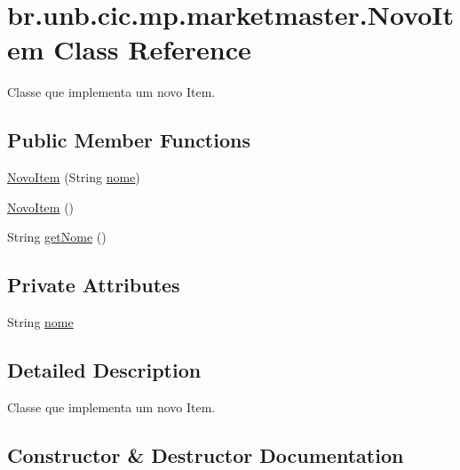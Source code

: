 \hypertarget{classbr_1_1unb_1_1cic_1_1mp_1_1marketmaster_1_1NovoItem}{}\section{br.\+unb.\+cic.\+mp.\+marketmaster.\+Novo\+Item Class Reference}
\label{classbr_1_1unb_1_1cic_1_1mp_1_1marketmaster_1_1NovoItem}


Classe que implementa um novo Item.  


\subsection*{Public Member Functions}
\begin{DoxyCompactItemize}
\item 
\mbox{\hyperlink{classbr_1_1unb_1_1cic_1_1mp_1_1marketmaster_1_1NovoItem_a4899dd2c093220a02efad4d4631515eb}{Novo\+Item}} (String \mbox{\hyperlink{classbr_1_1unb_1_1cic_1_1mp_1_1marketmaster_1_1NovoItem_aad525529a4cc862db37990ffa93df983}{nome}})
\item 
\mbox{\hyperlink{classbr_1_1unb_1_1cic_1_1mp_1_1marketmaster_1_1NovoItem_ac355bd6d0a0c8d90d84b3e926c0405bf}{Novo\+Item}} ()
\item 
String \mbox{\hyperlink{classbr_1_1unb_1_1cic_1_1mp_1_1marketmaster_1_1NovoItem_a7abc41e76abf1f6e19e0624ce954df1e}{get\+Nome}} ()
\end{DoxyCompactItemize}
\subsection*{Private Attributes}
\begin{DoxyCompactItemize}
\item 
String \mbox{\hyperlink{classbr_1_1unb_1_1cic_1_1mp_1_1marketmaster_1_1NovoItem_aad525529a4cc862db37990ffa93df983}{nome}}
\end{DoxyCompactItemize}


\subsection{Detailed Description}
Classe que implementa um novo Item. 

\subsection{Constructor \& Destructor Documentation}
\mbox{\label{classbr_1_1unb_1_1cic_1_1mp_1_1marketmaster_1_1NovoItem_a4899dd2c093220a02efad4d4631515eb}} 
